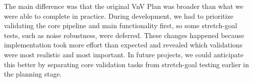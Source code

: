 \documentclass[12pt, titlepage]{article}
\begin{document}
\begin{enumerate}
  The main difference was that the original VnV Plan was broader than what we were able to complete in practice. During development, we had to prioritize validating the core pipeline and main functionality first, so some stretch-goal tests, such as noise robustness, were deferred. These changes happened because implementation took more effort than expected and revealed which validations were most realistic and most important. In future projects, we could anticipate this better by separating core validation tasks from stretch-goal testing earlier in the planning stage.
\end{enumerate}
\end{document}
